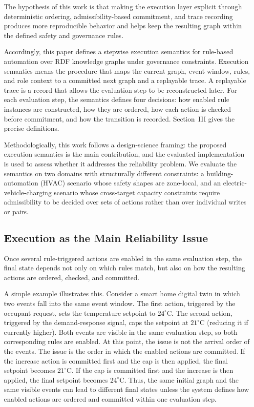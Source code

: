 \documentclass{ieeeaccess}
\theoremstyle{definition}
\theoremstyle{plain}
\theoremstyle{remark}
\begin{document}
The hypothesis of this work is that making the execution layer explicit through deterministic ordering, admissibility-based commitment, and trace recording produces more reproducible behavior and helps keep the resulting graph within the defined safety and governance rules.

Accordingly, this paper defines a stepwise execution semantics for rule-based automation over RDF knowledge graphs under governance constraints. Execution semantics means the procedure that maps the current graph, event window, rules, and role context to a committed next graph and a replayable trace. A replayable trace is a record that allows the evaluation step to be reconstructed later. For each evaluation step, the semantics defines four decisions: how enabled rule instances are constructed, how they are ordered, how each action is checked before commitment, and how the transition is recorded. Section~III gives the precise definitions.

Methodologically, this work follows a design-science framing: the proposed execution semantics is the main contribution, and the evaluated implementation is used to assess whether it addresses the reliability problem. We evaluate the semantics on two domains with structurally different constraints: a building-automation (HVAC) scenario whose safety shapes are zone-local, and an electric-vehicle-charging scenario whose cross-target capacity constraints require admissibility to be decided over sets of actions rather than over individual writes or pairs.

\subsection{Execution as the Main Reliability Issue}

Once several rule-triggered actions are enabled in the same evaluation step, the final state depends not only on which rules match, but also on how the resulting actions are ordered, checked, and committed.

A simple example illustrates this. Consider a smart home digital twin in which two events fall into the same event window. The first action, triggered by the occupant request, sets the temperature setpoint to $24^\circ$C. The second action, triggered by the demand-response signal, caps the setpoint at $21^\circ$C (reducing it if currently higher). Both events are visible in the same evaluation step, so both corresponding rules are enabled. At this point, the issue is not the arrival order of the events. The issue is the order in which the enabled actions are committed. If the increase action is committed first and the cap is then applied, the final setpoint becomes $21^\circ$C. If the cap is committed first and the increase is then applied, the final setpoint becomes $24^\circ$C. Thus, the same initial graph and the same visible events can lead to different final states unless the system defines how enabled actions are ordered and committed within one evaluation step.
\end{document}
